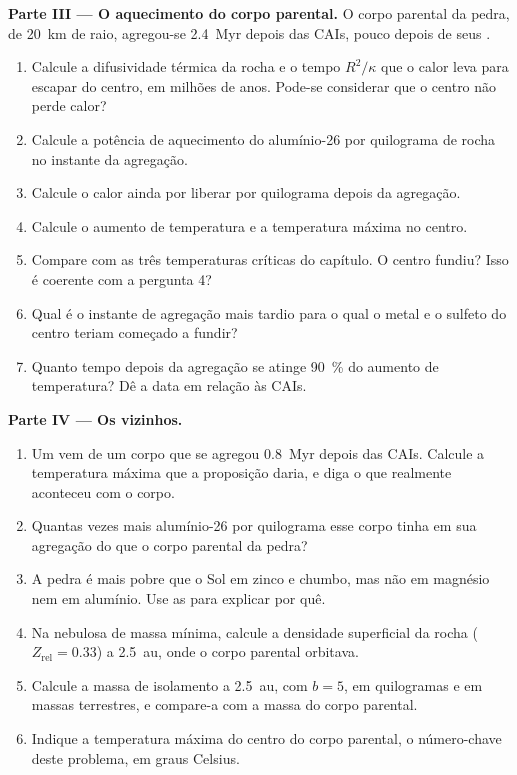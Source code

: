 \begin{problem}
\noindent\textbf{Parte III --- O aquecimento do corpo parental.}
O corpo parental da pedra, de \qty{20}{km} de raio, agregou-se \qty{2.4}{Myr} depois
das CAIs, pouco depois de seus .
\begin{enumerate}[resume]
  \item Calcule a difusividade térmica da rocha e o tempo $R^2/\kappa$ que o
        calor leva para escapar do centro, em milhões de anos. Pode-se considerar que o centro
        não perde calor?
  \item Calcule a potência de aquecimento do alumínio-26 por quilograma de rocha no instante
        da agregação.
  \item Calcule o calor ainda por liberar por quilograma depois da agregação.
  \item Calcule o aumento de temperatura e a temperatura máxima no centro.
  \item Compare com as três temperaturas críticas do capítulo. O
        centro fundiu? Isso é coerente com a pergunta 4?
  \item Qual é o instante de agregação mais tardio para o qual o metal e o sulfeto do
        centro teriam começado a fundir?
  \item Quanto tempo depois da agregação se atinge \qty{90}{\percent} do aumento de
        temperatura? Dê a data em relação às CAIs.
\end{enumerate}

\noindent\textbf{Parte IV --- Os vizinhos.}
\begin{enumerate}[resume]
  \item Um  vem de um corpo que se agregou \qty{0.8}{Myr} depois das
        CAIs. Calcule a temperatura máxima que a proposição daria, e diga
        o que realmente aconteceu com o corpo.
  \item Quantas vezes mais alumínio-26 por quilograma esse corpo tinha em sua
        agregação do que o corpo parental da pedra?
  \item A pedra é mais pobre que o Sol em zinco e chumbo, mas não em magnésio nem em
        alumínio. Use as  para explicar por quê.
  \item Na nebulosa de massa mínima, calcule a densidade superficial da rocha
        ($Z_{\mathrm{rel}} = 0.33$) a \qty{2.5}{au}, onde o corpo parental
        orbitava.
  \item Calcule a massa de isolamento a \qty{2.5}{au}, com $b = 5$, em quilogramas e
        em massas terrestres, e compare-a com a massa do corpo parental.
  \item Indique a temperatura máxima do centro do corpo parental, o número-chave
        deste problema, em graus Celsius.
\end{enumerate}
\end{problem}
